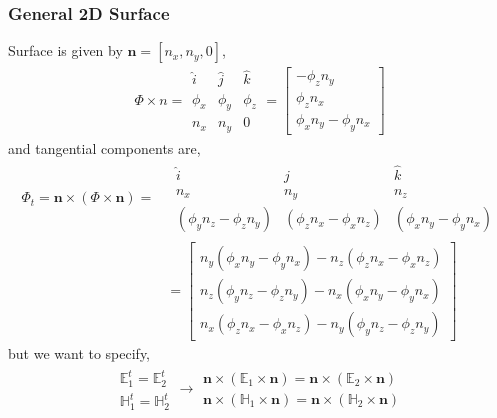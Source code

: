 \documentclass{article}
\newcommand{\n}{\mathbf{n}}
\newcommand{\0}{\varnothing}
\newcommand{\Ev}{\mathbb{E}}
\newcommand{\Hv}{\mathbb{H}}
\begin{document}
\subsubsection*{General 2D Surface}
Surface is given by $\n = [n_x,n_y,0]$,
\begin{align*}
    \Phi \times n = 
    \begin{array}{|ccc|}
    \hat i & \hat j & \hat k\\
    \phi_x & \phi_y & \phi_z \\
        n_x & n_y & 0     
    \end{array}
    = 
    \left[
    \begin{array}{c}
        - \phi_z n_y\\
        \phi_z n_x \\
        \phi_x n_y - \phi_y n_x
    \end{array}
    \right]
\end{align*}
 and tangential components are,
\begin{align*}
    \Phi_t = \n \times (\Phi \times \n) = &\;\begin{array}{|ccc|}
    \hat i & \hat j & \hat k\\
    n_x & n_y & n_z     \\
    (\phi_y n_z - \phi_z n_y) & (\phi_z n_x - \phi_x n_z) & (\phi_x n_y - \phi_y n_x)
    \end{array}\\
    &= \left[
    \begin{array}{c}
     n_y (\phi_x n_y - \phi_y n_x) - n_z (\phi_z n_x - \phi_x n_z) \\
       n_z (\phi_y n_z - \phi_z n_y) - n_x (\phi_x n_y - \phi_y n_x)\\
       n_x (\phi_z n_x - \phi_x n_z) - n_y (\phi_y n_z - \phi_z n_y)
       \end{array} \right]
\end{align*}
but we want to specify,
\begin{align*}
    \begin{array}{c}
    \Ev^t_{1} = \Ev^t_{2} \\
    \Hv^t_{1} = \Hv^t_{2} 
    \end{array}  \rightarrow
    \begin{array}{c}
    \n \times (\Ev_1 \times \n) = \n \times (\Ev_2 \times \n)\\ 
    \n \times (\Hv_1 \times \n) = \n \times (\Hv_2 \times \n)
    \end{array} 
\end{align*}
\end{document}
